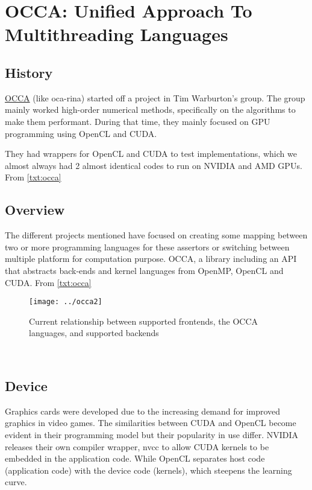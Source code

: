 
\section{OCCA: Unified Approach To Multithreading Languages}
\subsection{History}
\href{https://scholarship.rice.edu/bitstream/handle/1911/102233/TR15-04.pdf?sequence=1&isAllowed=y}{OCCA} (like oca-rina) started off a project in  Tim Warburton's group. The group mainly worked high-order numerical methods, specifically on the algorithms to make them performant. During that time, they mainly focused on GPU programming using OpenCL and CUDA.

They had wrappers for OpenCL and CUDA to test implementations, which we almost always had 2 almost identical codes to run on NVIDIA and AMD GPUs. From \ref{txt:occa} 
\subsection{Overview}
The different projects mentioned have focused on creating some mapping between two or more programming languages for these assertors or switching between multiple platform for computation purpose. OCCA, a library including an API that abstracts back-ends and kernel languages from OpenMP, OpenCL and CUDA. From \ref{txt:occa} 
\begin{figure}
\centering
\texttt{[image: ../occa2]}
\caption{ Current relationship between supported frontends, the OCCA languages, and supported backends}
\end{figure}\\
\subsection {Device}
Graphics cards were developed due to the increasing demand for improved graphics in video games. The similarities between CUDA and OpenCL become evident in their programming model but their popularity in use differ. NVIDIA releases their own compiler wrapper, nvcc to allow CUDA kernels to be embedded in the application code. While OpenCL separates host code (application code) with the device code (kernels), which steepens the learning curve.\\
